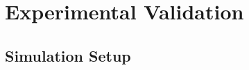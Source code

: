 \documentclass[8pt, aspectratio=169]{beamer}
\begin{document}

\section{Experimental Validation}

\subsection{Simulation Setup}
\end{document}

